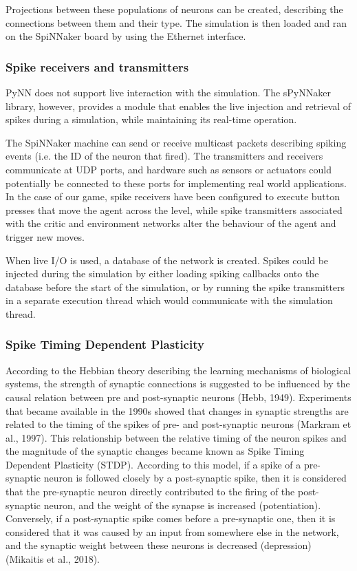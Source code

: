 \documentclass[10pt]{article}
\begin{document}
    Projections between these populations of neurons can be created, describing the connections between them and their type. The simulation is then loaded and ran on the SpiNNaker board by using the Ethernet interface.

    \subsubsection{Spike receivers and transmitters}

    PyNN does not support live interaction with the simulation. The sPyNNaker library, however, provides a module that enables the live injection and retrieval of spikes during a simulation, while maintaining its real-time operation.

    The SpiNNaker machine can send or receive multicast packets describing spiking events (i.e. the ID of the neuron that fired). The transmitters and receivers communicate at UDP ports, and hardware such as sensors or actuators could potentially be connected to these ports for implementing real world applications. In the case of our game, spike receivers have been configured to execute button presses that move the agent across the level, while spike transmitters associated with the critic and environment networks alter the behaviour of the agent and trigger new moves.

    When live I/O is used, a database of the network is created. Spikes could be injected during the simulation by either loading spiking callbacks onto the database before the start of the simulation, or by running the spike transmitters in a separate execution thread which would communicate with the simulation thread.

    \subsubsection{Spike Timing Dependent Plasticity}

    According to the Hebbian theory describing the learning mechanisms of biological systems, the strength of synaptic connections is suggested to be influenced by the causal relation between pre and post-synaptic neurons (Hebb, 1949). Experiments that became available in the 1990s showed that changes in synaptic strengths are related to the timing of the spikes of pre- and post-synaptic neurons (Markram et al., 1997). This relationship between the relative timing of the neuron spikes and the magnitude of the synaptic changes became known as Spike Timing Dependent Plasticity (STDP). According to this model, if a spike of a pre-synaptic neuron is followed closely by a post-synaptic spike, then it is considered that the pre-synaptic neuron directly contributed to the firing of the post-synaptic neuron, and the weight of the synapse is increased (potentiation). Conversely, if a post-synaptic spike comes before a pre-synaptic one, then it is considered that it was caused by an input from somewhere else in the network, and the synaptic weight between these neurons is decreased (depression) (Mikaitis et al., 2018).
\end{document}
